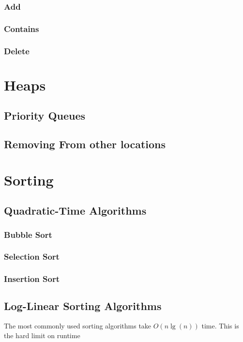 \documentclass[10pt,a4paper]{book}
\begin{document}
\subsection{Add}




\subsection{Contains}

\subsection{Delete}


\chapter{Heaps}


\section{Priority Queues}

\section{Removing From other locations}

\chapter{Sorting}


\section{Quadratic-Time Algorithms}

\subsection{Bubble Sort}

\subsection{Selection Sort}

\subsection{Insertion Sort}


\section{Log-Linear Sorting Algorithms}
The most commonly used sorting algorithms take $ O(n \lg(n)) $ time.
This is the hard limit on runtime %
\end{document}
